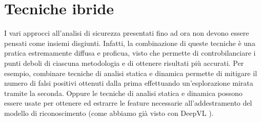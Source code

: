 \documentclass[../main.tex]{subfiles}
\begin{document}
\section{Tecniche ibride}
I vari approcci all'analisi di sicurezza presentati fino ad ora non devono essere pensati come insiemi disgiunti. Infatti, la combinazione di queste tecniche è una pratica estremamente diffusa e proficua, visto che permette
di controbilanciare i punti deboli di ciascuna metodologia e di ottenere risultati più accurati. Per esempio, combinare tecniche di analisi statica e dinamica permette di mitigare il numero di falsi positivi ottenuti dalla prima
effettuando un'esplorazione mirata tramite la seconda. Oppure le tecniche di analisi statica e dinamica possono essere usate per ottenere ed estrarre le feature necessarie all'addestramento del modello di riconoscimento (come abbiamo già visto con DeepVL \cite{DeepVL}).
\end{document}
